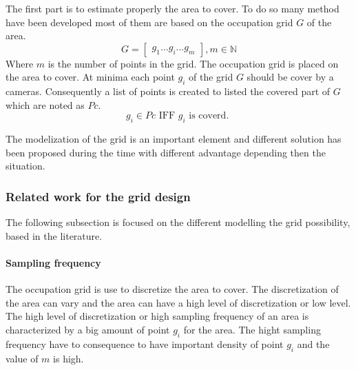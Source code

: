 
The first part is to estimate properly the area to cover. To do so many method have been developed most of them are based on the occupation grid $G$ of the area. 
\begin{equation}\label{eq:Grid}
	G=\begin{bmatrix}
	 	g_1 ...g_i ... g_m
	\end{bmatrix}  , m\in \mathbb{N}
\end{equation}
Where $m$ is the number of points in the grid.
The occupation grid is placed on the area to cover. At minima each point $g_i$ of the grid $G$ should be cover by a cameras. Consequently a list of points is created to listed the covered part of $G$ which are noted as $Pc$.
\begin{equation}\label{eq:Pci}
g_i \in Pc \mbox{ IFF } g_i \mbox{ is coverd. }
\end{equation}


The modelization of the grid is an important element and different solution has been proposed during the time with different advantage depending then the situation.\\

\subsubsection*{Related work for the grid design}
The following subsection is focused on the different  modelling the grid possibility, based in the literature. 

\paragraph*{ Sampling frequency} %
The occupation grid is use to discretize the area to cover. The discretization of the area can vary and the area can have a high level of discretization or low level. 
The high level of discretization or high sampling frequency of an area is characterized by a big amount of point $g_i$ for the area. The hight sampling frequency have to consequence to have important density of point $g_i$ and the value of $m$ is high. 

%
 
